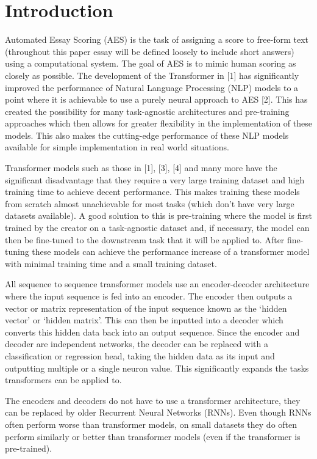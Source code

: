\hypertarget{introduction}{%
\section{Introduction}\label{introduction}}

Automated Essay Scoring (AES) is the task of assigning a score to
free-form text (throughout this paper essay will be defined loosely to
include short answers) using a computational system. The goal of AES is
to mimic human scoring as closely as possible. The development of the
Transformer in {[}1{]} has significantly improved the performance of
Natural Language Processing (NLP) models to a point where it is
achievable to use a purely neural approach to AES {[}2{]}. This has
created the possibility for many task-agnostic architectures and
pre-training approaches which then allows for greater flexibility in the
implementation of these models. This also makes the cutting-edge
performance of these NLP models available for simple implementation in
real world situations.

Transformer models such as those in {[}1{]}, {[}3{]}, {[}4{]} and many
more have the significant disadvantage that they require a very large
training dataset and high training time to achieve decent performance.
This makes training these models from scratch almost unachievable for
most tasks (which don't have very large datasets available). A good
solution to this is pre-training where the model is first trained by the
creator on a task-agnostic dataset and, if necessary, the model can then
be fine-tuned to the downstream task that it will be applied to. After
fine-tuning these models can achieve the performance increase of a
transformer model with minimal training time and a small training
dataset.

All sequence to sequence transformer models use an encoder-decoder
architecture where the input sequence is fed into an encoder. The
encoder then outputs a vector or matrix representation of the input
sequence known as the `hidden vector' or `hidden matrix'. This can then
be inputted into a decoder which converts this hidden data back into an
output sequence. Since the encoder and decoder are independent networks,
the decoder can be replaced with a classification or regression head,
taking the hidden data as its input and outputting multiple or a single
neuron value. This significantly expands the tasks transformers can be
applied to.

The encoders and decoders do not have to use a transformer architecture,
they can be replaced by older Recurrent Neural Networks (RNNs). Even
though RNNs often perform worse than transformer models, on small
datasets they do often perform similarly or better than transformer
models (even if the transformer is pre-trained).

